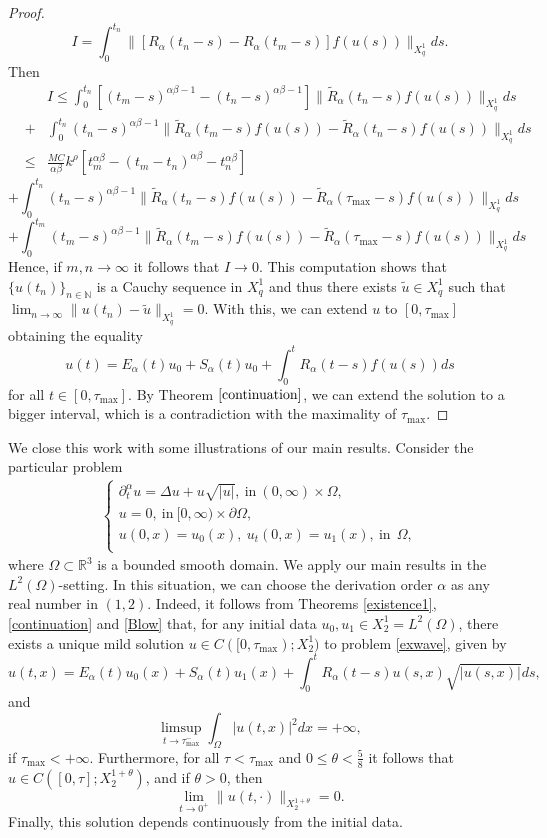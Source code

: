 \documentclass[12pt,reqno]{amsart}
\begin{document}
\begin{proof}
	$$I=\int_{0}^{t_n}\|[R_{\alpha}(t_n-s)-R_{\alpha}(t_m-s)]f(u(s))\|_{X^{1}_{q}}ds.$$
	Then
	\begin{eqnarray*}
		&&	I \leq \int_{0}^{t_n}[(t_m-s)^{\alpha\beta-1}-(t_n-s)^{\alpha\beta-1}]\|\tilde{R}_{\alpha}(t_n-s)f(u(s))\|_{X^{1}_{q}}ds\\
		&+& \!\!\!\!\!\!\int_{0}^{t_n}(t_n-s)^{\alpha\beta-1}\|\tilde{R}_{\alpha}(t_m-s)f(u(s))-\tilde{R}_{\alpha}(t_n-s)f(u(s))\|_{X^{1}_{q}}ds\\
		&\leq&\frac{MC}{\alpha\beta}k^{\rho}[t_m^{\alpha\beta}-(t_m-t_n)^{\alpha\beta}-t_n^{\alpha\beta}]
	\end{eqnarray*}
	$$+ \int_{0}^{t_n}(t_n - s)^{\alpha\beta-1}\|\tilde{R}_{\alpha}(t_n-s)f(u(s))-\tilde{R}_{\alpha}(\tau_{\max}-s)f(u(s))\|_{X^{1}_{q}}ds$$
	$$+ \int_{0}^{t_m}(t_m - s)^{\alpha\beta-1}\|\tilde{R}_{\alpha}(t_m-s)f(u(s))-\tilde{R}_{\alpha}(\tau_{\max}-s)f(u(s))\|_{X^{1}_{q}}ds$$
	Hence, if $m,n\rightarrow \infty$ it follows that $I\to0$. This computation shows that  $\{u(t_n)\}_{n\in\mathbb{N}}$ is a Cauchy  sequence in $X^{1}_{q}$ and thus there exists $\tilde{u}\in X^{1}_{q}$ such that 
	$\lim_{n\rightarrow\infty}\|u(t_n)-\tilde{u}\|_{X^{1}_{q}}=0.$
	With this, we can extend $u$ to $[0,\tau_{\max}]$ obtaining the equality  
	$$u(t)=E_{\alpha}(t)u_0+S_{\alpha}(t)u_0+ \int_{0}^{t}R_{\alpha}(t-s)f(u(s))ds$$
	for all $t\in[0,\tau_{\max}]$. By Theorem $\ref{continuation}$, we can extend the solution to a bigger interval, which is a contradiction with the maximality of  $\tau_{\max}$.
\end{proof}


We close this work with some illustrations of our main results. Consider the particular problem 
\begin{eqnarray}\label{exwave}	 					
	\left\{\begin{array}{lrr}
		\partial_t^{\alpha}u  = \Delta u  + u\sqrt{ |u|}, \ \mbox{in}\ (0,\infty)\times\Omega,\\	
		u  =  0, \ \mbox{in} \  [0,\infty)\times \partial\Omega,\\
		u(0,x)=u_0(x),\ u_t(0,x)=u_1(x),\ \mbox{in}\ \ \Omega,\\
	\end{array} \right.	
\end{eqnarray}
where $\Omega \subset\mathbb{R}^3$ is a bounded smooth domain.  We apply our main results in the $L^2(\Omega)$-setting.  In this situation, we can choose the derivation order $\alpha$ as any real number in $(1,2)$. Indeed, it follows from Theorems \ref{existence1}, \ref{continuation} and \ref{Blow} that, for any initial data $u_0,u_1\in X^{1}_{2}=L^2(\Omega)$, there exists a unique mild solution $u\in C([0,\tau_{\max});X^{1}_{2})$ to problem \eqref{exwave}, given by
$$u(t,x)= E_{\alpha}(t)u_0(x)+S_{\alpha}(t )u_1(x)+\int_{0}^{t}R_{\alpha}(t-s)u(s,x)\sqrt{|u(s,x)|}ds, $$
and 
$$\limsup_{t\to\tau_{\max}^{-}}\int_{\Omega}|u(t,x)|^2dx=+\infty,$$ %
if $\tau_{\max}<+\infty$. Furthermore, for all $\tau<\tau_{\max}$ and $0\le \theta <\frac{5}{8}$ it follows that $u\in C([0,\tau];X^{1+\theta}_{2})$, and if $\theta>0$, then 
$$\lim_{t\to0^{+}}\|u(t,\cdot)\|_{X^{1+\theta}_{2}}=0.$$
Finally, this solution depends continuously from the initial data.
\end{document}
